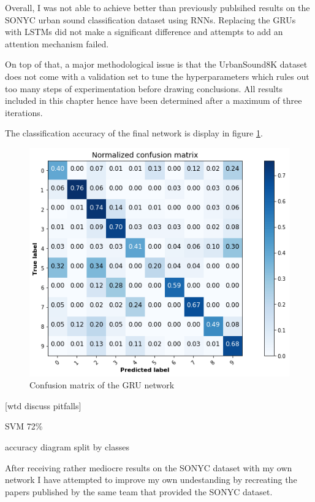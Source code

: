 Overall, I was not able to achieve better than previously publsihed results on the SONYC urban sound classification dataset using RNNs. Replacing the GRUs with LSTMs did not make a significant difference and attempts to add an attention mechanism failed.

On top of that, a major methodological issue is that the UrbanSound8K dataset does not come with a validation set to tune the hyperparameters which rules out too many steps of experimentation before drawing conclusions. All results included in this chapter hence have been determined after a maximum of three iterations.

The classification accuracy of the final network is display in figure \ref{fig:cfcnn}.

\begin{figure}[h]
    \centering
    \vspace{15pt}
	\includegraphics[width=.8\textwidth]{./images/illustrations/confusion-cnn}
    \caption{Confusion matrix of the GRU network}
    \label{fig:cfcnn}
\end{figure}

[wtd discuss pitfalls]


SVM 72\%



accuracy diagram split by classes

After receiving rather mediocre results on the SONYC dataset with my own network I have attempted to improve my own undestanding by recreating the papers published by the same team that provided the SONYC dataset.




